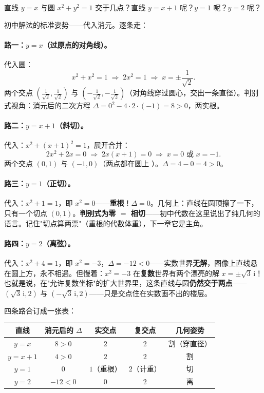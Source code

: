\begin{kaiwei}
直线 $y = x$ 与圆 $x^2 + y^2 = 1$ 交于几点？直线 $y = x + 1$ 呢？$y = 1$ 呢？$y = 2$ 呢？
\end{kaiwei}

初中解法的标准姿势——代入消元。逐条走：

\paragraph{路一：$y = x$（过原点的对角线）。}代入圆：
\[
x^2 + x^2 = 1 \;\Longrightarrow\; 2x^2 = 1 \;\Longrightarrow\; x = \pm\frac1{\sqrt2}.
\]
两个交点 $\left(\tfrac1{\sqrt2}, \tfrac1{\sqrt2}\right)$ 与 $\left(-\tfrac1{\sqrt2}, -\tfrac1{\sqrt2}\right)$（对角线穿过圆心，交出一条直径）。判别式视角：消元后的二次方程 $\Delta = 0^2 - 4\cdot2\cdot(-1) = 8 > 0$，两实根。

\paragraph{路二：$y = x + 1$（斜切）。}代入：$x^2 + (x+1)^2 = 1$，展开合并：
\[
2x^2 + 2x = 0 \;\Longrightarrow\; 2x(x + 1) = 0 \;\Longrightarrow\; x = 0 \text{ 或 } x = -1 .
\]
两个交点 $(0, 1)$ 与 $(-1, 0)$（两点都在圆上 \checkmark）。$\Delta = 4 - 0 = 4 > 0$。

\paragraph{路三：$y = 1$（正切）。}代入：$x^2 + 1 = 1$，即 $x^2 = 0$——\textbf{重根}！$\Delta = 0$。几何上：直线在圆顶擦了一下，只有一个切点 $(0, 1)$。\textbf{判别式为零 $=$ 相切}——初中代数在这里说出了纯几何的语言。记住"切点算两票"（重根的代数体重），下一章它是主角。

\paragraph{路四：$y = 2$（离弦）。}代入：$x^2 + 4 = 1$，即 $x^2 = -3$，$\Delta = -12 < 0$——实数世界\textbf{无解}，图像上直线悬在圆上方，永不相遇。但慢着：$x^2 = -3$ 在\textbf{复数}世界有两个漂亮的解 $x = \pm\sqrt3\,\mathrm{i}$！也就是说，在"允许复数坐标"的扩大世界里，这条直线与圆\textbf{仍然交于两点}——$(\sqrt3\,\mathrm{i}, 2)$ 与 $(-\sqrt3\,\mathrm{i}, 2)$——只是交点住在实数画不出的楼层。

四条路合订成一张表：

\begin{center}
\begin{tabular}{ccccc}
\toprule
直线 & 消元后的 $\Delta$ & 实交点 & 复交点 & 几何姿势 \\
\midrule
$y = x$ & $8 > 0$ & $2$ & $2$ & 割（穿直径） \\
$y = x+1$ & $4 > 0$ & $2$ & $2$ & 割 \\
$y = 1$ & $0$ & $1$（重根） & $2$（计重） & 切 \\
$y = 2$ & $-12 < 0$ & $0$ & $2$ & 离 \\
\bottomrule
\end{tabular}
\end{center}

